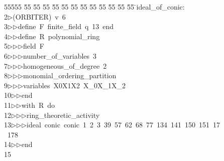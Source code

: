 %
%
\begin{tabbing}
55555 \= 55 \= 55 \= 55 \= 55 \= 55 \= 55 \= 55 \= 55 \= 55 \= 55 \= 55 \= 55 \= \>ideal\_of\_conic:\\[0pt]
2\>$\triangleright$\>(ORBITER)\ v\ 6\ \\[0pt]
3\>$\triangleright$\>$\triangleright$\>define\ F\ finite\_field\ q\ 13\ end\ \\[0pt]
4\>$\triangleright$\>$\triangleright$\>define\ R\ polynomial\_ring\ \\[0pt]
5\>$\triangleright$\>$\triangleright$\>$\triangleright$\>field\ F\ \\[0pt]
6\>$\triangleright$\>$\triangleright$\>$\triangleright$\>number\_of\_variables\ 3\ \\[0pt]
7\>$\triangleright$\>$\triangleright$\>$\triangleright$\>homogeneous\_of\_degree\ 2\ \\[0pt]
8\>$\triangleright$\>$\triangleright$\>$\triangleright$\>monomial\_ordering\_partition\ \\[0pt]
9\>$\triangleright$\>$\triangleright$\>$\triangleright$\>variables\ X0X1X2\ X\_0X\_1X\_2\ \\[0pt]
10\>$\triangleright$\>$\triangleright$\>end\ \\[0pt]
11\>$\triangleright$\>$\triangleright$\>with\ R\ do\ \\[0pt]
12\>$\triangleright$\>$\triangleright$\>$\triangleright$\>ring\_theoretic\_activity\ \\[0pt]
13\>$\triangleright$\>$\triangleright$\>$\triangleright$\>ideal\ conic\ conic\ 1\ 2\ 3\ 39\ 57\ 62\ 68\ 77\ 134\ 141\ 150\ 151\ 17\\[0pt]
\ 178\ \\[0pt]
14\>$\triangleright$\>$\triangleright$\>end\\[0pt]
15\>\end{tabbing}
